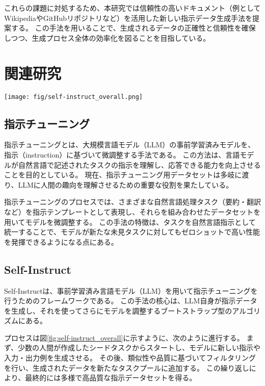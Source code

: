 \documentclass[twocolumn]{jsarticle}
\begin{document}
これらの課題に対処するため、本研究では信頼性の高いドキュメント（例としてWikipediaやGitHubリポジトリなど）を活用した新しい指示データ生成手法を提案する。
この手法を用いることで、生成されるデータの正確性と信頼性を確保しつつ、生成プロセス全体の効率化を図ることを目指している。




\section{関連研究}
\begin{figure*}[t]
    \centering
    \texttt{[image: fig/self-instruct\_overall.png]}
    \caption{Self-Instructの全体像(\cite{Self-Instruct}より引用)}
    \label{fig:self-instruct_overall}
\end{figure*}

\subsection{指示チューニング}
指示チューニング\cite{Instruction-Tuning}とは、大規模言語モデル（LLM）の事前学習済みモデルを、指示（instruction）に基づいて微調整する手法である。
この方法は、言語モデルが自然言語で記述されたタスクの指示を理解し、応答できる能力を向上させることを目的としている。
現在、指示チューニング用データセットは多岐に渡り、LLMに人間の趣向を理解させるための重要な役割を果たしている。

指示チューニングのプロセスでは、さまざまな自然言語処理タスク（要約・翻訳など）を指示テンプレートとして表現し、それらを組み合わせたデータセットを用いてモデルを微調整する。
この手法の特徴は、タスクを自然言語指示として統一することで、モデルが新たな未見タスクに対してもゼロショットで高い性能を発揮できるようになる点にある。

\subsection{Self-Instruct}
Self-Instruct\cite{Self-Instruct}は、事前学習済み言語モデル（LLM）を用いて指示チューニングを行うためのフレームワークである。
この手法の核心は、LLM自身が指示データを生成し、それを使ってさらにモデルを調整するブートストラップ型のアルゴリズムにある。

プロセスは図\ref{fig:self-instruct_overall}に示すように、次のように進行する。
まず、少数の人間が作成したシードタスクからスタートし、モデルに新しい指示や入力・出力例を生成させる。
その後、類似性や品質に基づいてフィルタリングを行い、生成されたデータを新たなタスクプールに追加する。
この繰り返しにより、最終的には多様で高品質な指示データセットを得る。
\end{document}
